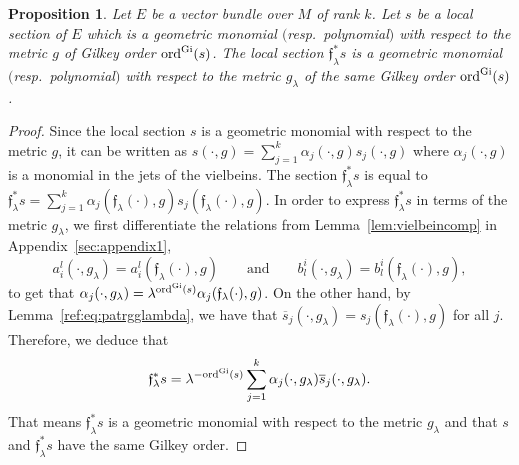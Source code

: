 \documentclass[10pt,a4paper]{amsart}
\numberwithin{equation}{section}
\newtheorem{prop}[thm]{Proposition}
\theoremstyle{definition}
\begin{document}
\begin{prop} \label{pro:flambdas} Let $E$ be a vector bundle over $M$ of rank $k$. Let $s$ be a local section of $E$ which is a geometric monomial $($resp.\ polynomial$)$ with respect to the metric $g$ of Gilkey order ${\rm ord}^{\rm Gi}(s)$. The local section $\mathfrak{f}_\lambda^*s$ is a geometric monomial $($resp.\ polynomial$)$ with respect to the metric $g_\lambda$ of the same Gilkey order ${\rm ord}^{\rm Gi}(s)$.
\end{prop}
\begin{proof} Since the local section $s$ is a geometric monomial with respect to the metric $g$, it can be written as $s(\cdot,g)=\sum_{j=1}^k \alpha_j(\cdot,g)s_j(\cdot,g)$ where $\alpha_j(\cdot,g)$ is a monomial in the jets of the vielbeins. The section $\mathfrak{f}_\lambda^*s$ is equal to $\mathfrak{f}_\lambda^*s=\sum_{j=1}^k \alpha_j(\mathfrak{f}_\lambda(\cdot),g)s_j(\mathfrak{f}_\lambda(\cdot),g)$. In order to express $\mathfrak{f}_\lambda^*s$ in terms of the metric $g_\lambda$, we first differentiate the relations from Lemma~\ref{lem:vielbeincomp} in Appendix~\ref{sec:appendix1},
\[
a_{i}^{l}(\cdot,g_\lambda)=a_{i}^{l}(\mathfrak{f}_\lambda(\cdot),g) \qquad\text{and}\qquad b_{l}^{i}(\cdot,g_\lambda)=b_{l}^{i}( {\mathfrak f}_\lambda(\cdot),g),
\]
to get that $\alpha_j(\cdot,g_\lambda)=\lambda^{{\rm ord}^{\rm Gi}(s)}\alpha_j(\mathfrak{f}_\lambda(\cdot),g)$. On the other hand, by Lemma~\ref{ref:eq:patrgglambda}, we have that $\overline{s}_j(\cdot,g_\lambda)=s_j(\mathfrak{f}_\lambda(\cdot),g)$ for all $j$. Therefore, we deduce that
\[\mathfrak{f}_\lambda^*s=\lambda^{-{\rm ord}^{\rm Gi}(s)}\sum_{j=1}^k \alpha_j(\cdot,g_\lambda)\overline{s}_j(\cdot,g_\lambda).\]
That means $\mathfrak{f}_\lambda^*s$ is a geometric monomial with respect to the metric $g_\lambda$ and that $s$ and $\mathfrak{f}_\lambda^*s$ have the same Gilkey order.
\end{proof}
\end{document}
